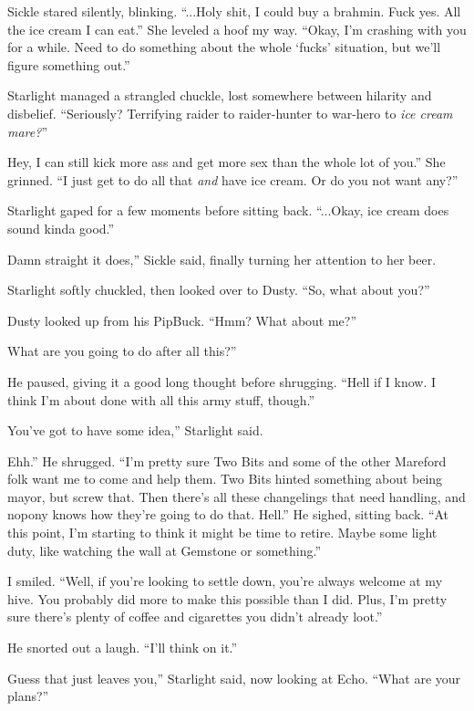 Sickle stared silently, blinking. “...Holy shit, I could buy a brahmin. Fuck yes. All the ice cream I can eat.” She leveled a hoof my way. “Okay, I’m crashing with you for a while. Need to do something about the whole ‘fucks’ situation, but we’ll figure something out.”

Starlight managed a strangled chuckle, lost somewhere between hilarity and disbelief. “Seriously? Terrifying raider to raider-hunter to war-hero to \textit{ice cream mare?}”

\leavevmode{}Hey, I can still kick more ass and get more sex than the whole lot of you.” She grinned. “I just get to do all that \textit{and} have ice cream. Or do you not want any?”

Starlight gaped for a few moments before sitting back. “...Okay, ice cream does sound kinda good.”

\leavevmode{}Damn straight it does,” Sickle said, finally turning her attention to her beer.

Starlight softly chuckled, then looked over to Dusty. “So, what about you?”

Dusty looked up from his PipBuck. “Hmm? What about me?”

\leavevmode{}What are you going to do after all this?”

He paused, giving it a good long thought before shrugging. “Hell if I know. I think I’m about done with all this army stuff, though.”

\leavevmode{}You’ve got to have some idea,” Starlight said.

\leavevmode{}Ehh.” He shrugged. “I’m pretty sure Two Bits and some of the other Mareford folk want me to come and help them. Two Bits hinted something about being mayor, but screw that. Then there’s all these changelings that need handling, and nopony knows how they’re going to do that. Hell.” He sighed, sitting back. “At this point, I’m starting to think it might be time to retire. Maybe some light duty, like watching the wall at Gemstone or something.”

I smiled. “Well, if you’re looking to settle down, you’re always welcome at my hive. You probably did more to make this possible than I did. Plus, I’m pretty sure there’s plenty of coffee and cigarettes you didn’t already loot.”

He snorted out a laugh. “I’ll think on it.”

\leavevmode{}Guess that just leaves you,” Starlight said, now looking at Echo. “What are your plans?”

